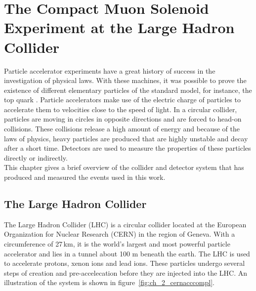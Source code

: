 \chapter{The Compact Muon Solenoid Experiment at the Large Hadron Collider}
\label{ch:detector}

%

Particle accelerator experiments have a great history of success in the investigation of physical laws. With these machines, it was possible to prove the existence of different elementary particles of the standard model, for instance, the top quark \cite{tdiscovery}. Particle accelerators make use of the electric charge of particles to accelerate them to velocities close to the speed of light. In a circular collider, particles are moving in circles in opposite directions and are forced to head-on collisions. These collisions release a high amount of energy and because of the laws of physics, heavy particles are produced that are highly unstable and decay after a short time. Detectors are used to measure the properties of these particles directly or indirectly.\\

This chapter gives a brief overview of the collider and detector system that has produced and measured the events used in this work. 

\section{The Large Hadron Collider}
The Large Hadron Collider (LHC) \cite{lhcguide,lhcweb} is a circular collider located at the European Organization for Nuclear Research (CERN) in the region of Geneva. With a circumference of 27\,km, it is the world's largest and most powerful particle accelerator and lies in a tunnel about 100 m beneath the earth. The LHC is used to accelerate protons, xenon ions and lead ions. These particles undergo several steps of creation and pre-accelecation before they are injected into the LHC. An illustration of the system is shown in figure~\ref{fig:ch_2_cernacccompl}.\\

